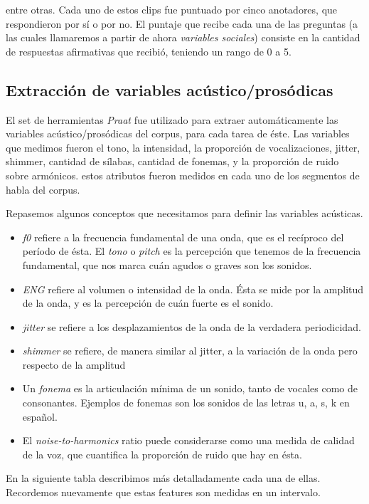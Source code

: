 entre otras. Cada uno de estos clips fue puntuado por cinco anotadores, que respondieron por sí o por no. El puntaje que recibe cada una de las preguntas (a las cuales llamaremos a partir de ahora \emph{variables sociales}) consiste en la cantidad de respuestas afirmativas que recibió, teniendo un rango de 0 a 5.

\subsection{Extracción de variables acústico/prosódicas}

El set de herramientas \emph{Praat} fue utilizado para extraer automáticamente las variables acústico/prosódicas del corpus, para cada tarea de éste. Las variables que medimos fueron el tono, la intensidad, la proporción de vocalizaciones, jitter, shimmer, cantidad de sílabas, cantidad de fonemas, y la proporción de ruido sobre armónicos. estos atributos fueron medidos en cada uno de los segmentos de habla del corpus.

Repasemos algunos conceptos que necesitamos para definir las variables acústicas.

\begin{itemize}
  \item \emph{f0} refiere a la frecuencia fundamental de una onda, que es el recíproco del período de ésta. El \emph{tono} o \emph{pitch} es la percepción que tenemos de la frecuencia fundamental, que nos marca cuán agudos o graves son los sonidos.
  \item \emph{ENG} refiere al volumen o intensidad de la onda. Ésta se mide por la amplitud de la onda, y es la percepción de cuán fuerte es el sonido.
  \item \emph{jitter} se refiere a los desplazamientos de la onda de la verdadera periodicidad.
  \item \emph{shimmer} se refiere, de manera similar al jitter, a la variación de la onda pero respecto de la amplitud
  \item Un \emph{fonema} es la articulación mínima de un sonido, tanto de vocales como de consonantes. Ejemplos de fonemas son los sonidos de las letras u, a, s, k en español.
  \item El \emph{noise-to-harmonics} ratio puede considerarse como una medida de calidad de la voz, que cuantifica la proporción de ruido que hay en ésta.
\end{itemize}


En la siguiente tabla describimos más detalladamente cada una de ellas. Recordemos nuevamente que estas features son medidas en un intervalo.

